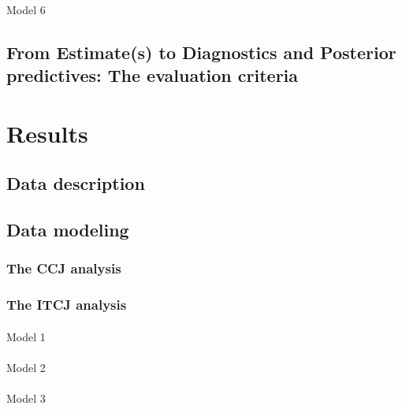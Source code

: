 \documentclass[
  authoryear,
  review,
  1p]{elsarticle}
\makeatletter
\let\oldparagraph\paragraph
\renewcommand{\paragraph}{
    \@ifstar
      \xxxParagraphStar
      \xxxParagraphNoStar
  }
\newcommand{\xxxParagraphStar}[1]{\oldparagraph*{#1}\mbox{}}
\newcommand{\xxxParagraphNoStar}[1]{\oldparagraph{#1}\mbox{}}
\makeatother
\begin{document}
\paragraph{Model 6}\label{sec-sec-methods_step5_2_itcj_6}

\subsection{From Estimate(s) to Diagnostics and Posterior predictives:
The evaluation criteria}\label{sec-methods_step6}

\section{Results}\label{sec-results}

\subsection{Data description}\label{sec-results_data}

\subsection{Data modeling}\label{sec-results_modeling}

\subsubsection{The CCJ analysis}\label{sec-results_modeling_1}

\subsubsection{The ITCJ analysis}\label{sec-results_modeling_2}

\paragraph{Model 1}\label{sec-results_modeling_2_1}

\paragraph{Model 2}\label{sec-results_modeling_2_2}

\paragraph{Model 3}\label{sec-results_modeling_2_3}
\end{document}
